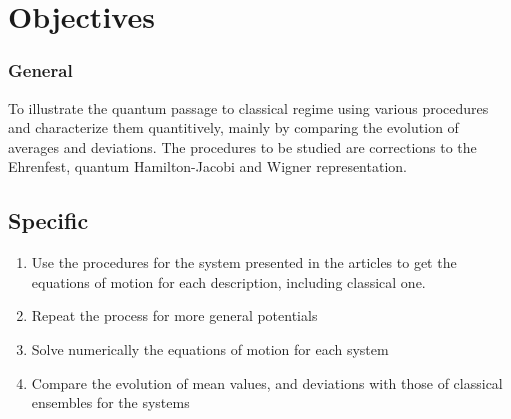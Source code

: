 \chapter{Objectives}

\subsection{General}

To illustrate the quantum passage to classical regime using various procedures and characterize them quantitively, mainly by comparing the evolution of averages and deviations. The procedures to be studied are corrections to the Ehrenfest, quantum Hamilton-Jacobi and Wigner representation.

\section{Specific}
\begin{enumerate}
    \item Use the procedures for the system presented in the articles to get the equations of motion for each description, including classical one. 
    \item Repeat the process for more general potentials
    \item Solve numerically the equations of motion for each system
    \item Compare the evolution of mean values, and deviations with those of classical ensembles for the systems
\end{enumerate}
